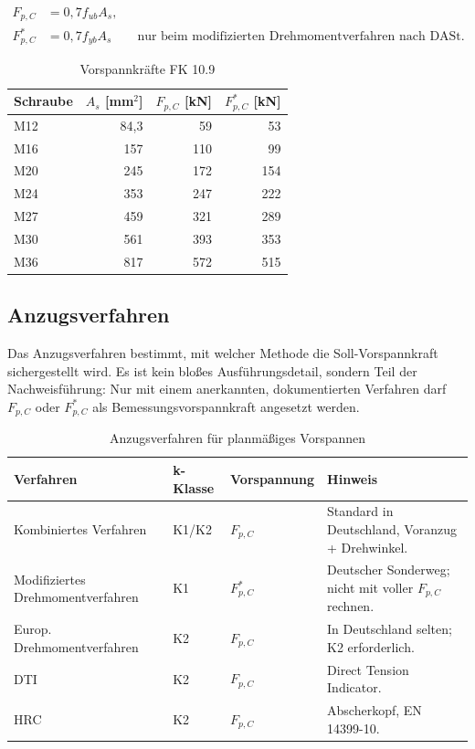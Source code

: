 \documentclass[10pt,a4paper]{article}
\begin{document}
\begin{align}
F_{p,C}&=0{,}7 f_{ub}A_s,\\
F_{p,C}^{*}&=0{,}7 f_{yb}A_s \qquad \text{nur beim modifizierten Drehmomentverfahren nach DASt.}
\end{align}

\begin{table}[H]
\centering
\caption{Vorspannkräfte FK 10.9}
\begin{tabular}{@{}lrrr@{}}
\toprule
\textbf{Schraube} & $A_s$ [mm$^2$] & $F_{p,C}$ [kN] & $F_{p,C}^{*}$ [kN] \\
\midrule
M12 & 84,3 & 59 & 53 \\
M16 & 157 & 110 & 99 \\
M20 & 245 & 172 & 154 \\
M24 & 353 & 247 & 222 \\
M27 & 459 & 321 & 289 \\
M30 & 561 & 393 & 353 \\
M36 & 817 & 572 & 515 \\
\bottomrule
\end{tabular}
\end{table}

\subsection{Anzugsverfahren}
Das Anzugsverfahren bestimmt, mit welcher Methode die Soll-Vorspannkraft sichergestellt wird. Es ist kein bloßes Ausführungsdetail, sondern Teil der Nachweisführung: Nur mit einem anerkannten, dokumentierten Verfahren darf $F_{p,C}$ oder $F_{p,C}^{*}$ als Bemessungsvorspannkraft angesetzt werden.

\begin{table}[H]
\centering
\caption{Anzugsverfahren für planmäßiges Vorspannen}
\begin{tabularx}{\textwidth}{@{}p{38mm}p{18mm}p{28mm}Y@{}}
\toprule
\textbf{Verfahren} & \textbf{k-Klasse} & \textbf{Vorspannung} & \textbf{Hinweis} \\
\midrule
Kombiniertes Verfahren & K1/K2 & $F_{p,C}$ & Standard in Deutschland, Voranzug + Drehwinkel. \\
Modifiziertes Drehmomentverfahren & K1 & $F_{p,C}^{*}$ & Deutscher Sonderweg; nicht mit voller $F_{p,C}$ rechnen. \\
Europ. Drehmomentverfahren & K2 & $F_{p,C}$ & In Deutschland selten; K2 erforderlich. \\
DTI & K2 & $F_{p,C}$ & Direct Tension Indicator. \\
HRC & K2 & $F_{p,C}$ & Abscherkopf, EN 14399-10. \\
\bottomrule
\end{tabularx}
\end{table}
\end{document}
